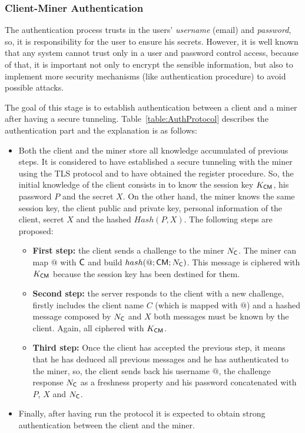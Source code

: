 \subsubsection{Client-Miner Authentication}
\label{ssec:SecAuth}


The authentication process trusts in the users' \textit{username} 
(email) and \textit{password}, so, it is responsibility for the user 
to ensure his secrets. However, it is well known that any system 
cannot trust only in a user and password control access, because of that, 
it is important not only to encrypt the sensible information, but also
to implement more security mechanisms (like authentication procedure) to 
avoid possible attacks.

The goal of this stage is to establish authentication between a client and 
a miner after having a secure tunneling. Table~\ref{table:AuthProtocol} 
describes the authentication part and the explanation is as follows:

\begin{itemize}
  \item Both the client and the miner store all knowledge accumulated
    of previous steps. It is considered to have established a secure tunneling 
    with the miner using the TLS protocol and to have obtained the register
    procedure. So, the initial knowledge of the client consists in to know 
    the session key $K_{\textsf{C}\textsf{M}}$, his password $P$ and the secret $X$. 
    On the other hand, the miner knows the same session key, the client public and
    private key, personal information of the client, secret $X$ and the hashed 
    $Hash(P,X)$. The following steps are proposed:
    \begin{itemize}
    \item \textbf{First step:} the client sends a challenge to the
      miner $N_{\textsf{C}}$. The miner can map $@$ with $\textsf{C}$ and build $hash(@;\textsf{C}\textsf{M}; N_{\textsf{C}})$. This message is ciphered with $K_{\textsf{C}\textsf{M}}$ because the session key has been destined for them. 
    \item \textbf{Second step:} the server responds to the client with a new challenge,
      firstly includes the client name $C$ (which is mapped with $@$) and a hashed message
      composed by $N_{\textsf{C}}$ and $X$ both messages must be known by the client. Again,
      all ciphered with $K_{\textsf{C}\textsf{M}}$.
    \item \textbf{Third step:} Once the client has accepted the previous step, it means that
      he has deduced all previous messages and he has authenticated to the miner, so, the 
      client sends back his username $@$, the challenge response $N_{\textsf{C}}$ as a freshness
      property and his password concatenated with $P$, $X$ and $N_{\textsf{C}}$.
  \end{itemize}
\item Finally, after having run the protocol it is expected to obtain strong authentication
    between the client and the miner. 
\end{itemize}
 
